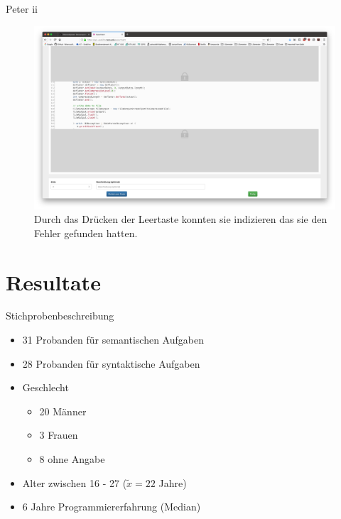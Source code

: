 \documentclass[10pt]{beamer}
\begin{document}
	\begin{frame}{Peter  ii}	
		\begin{figure}
			\includegraphics[scale=0.15]{graphics/peter_correction.png}
			\caption{\label{fig:peter_correction.png} Durch das Drücken der Leertaste konnten sie indizieren das sie den Fehler gefunden hatten.}
		\end{figure}
	\end{frame}

\section{Resultate}

	\begin{frame}{Stichprobenbeschreibung}
    
    \begin{itemize}
        \item 31 Probanden für semantischen Aufgaben
        \item 28 Probanden für syntaktische Aufgaben
        \item Geschlecht
        \begin{itemize}
            \item 20 Männer
            \item 3 Frauen
            \item 8 ohne Angabe
        \end{itemize}
        \item Alter zwischen 16 - 27 ($\tilde{x} = 22$ Jahre)
        \item 6 Jahre Programmiererfahrung (Median)
        
    \end{itemize}
	 
	\end{frame}
\end{document}
